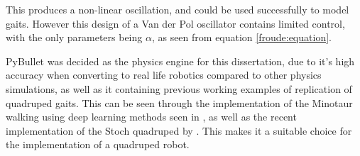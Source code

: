 This produces a non-linear oscillation, and could be used successfully to model gaits. However this design of a Van der Pol oscillator contains limited control, with the only parameters being $\alpha$, as seen from equation \ref{froude:equation}. 




 PyBullet was decided as the physics engine for this dissertation, due to it's high accuracy when converting to real life robotics \cite{Collins2018s} compared to other physics simulations, as well as it containing previous working examples of replication of quadruped gaits. This can be seen through the implementation of the Minotaur walking using deep learning methods seen in \cite{Tan2018},  as well as the recent implementation of the Stoch quadruped by \cite{Singla2018}. This makes it a suitable choice for the implementation of a quadruped robot.






